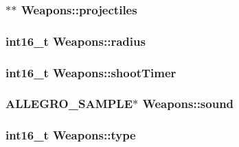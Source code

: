 \subsubsection[{projectiles}]{$\ast$$\ast$ Weapons\+::projectiles\hspace{0.3cm}{\ttfamily [protected]}}\label{class_weapons_a8495428b263ca37532201254df911dcc}
\hypertarget{class_weapons_a51aba0764e4873f32acc1f627328346f}{}
\subsubsection[{radius}]{\setlength{\rightskip}{0pt plus 5cm}int16\+\_\+t Weapons\+::radius\hspace{0.3cm}{\ttfamily [protected]}}\label{class_weapons_a51aba0764e4873f32acc1f627328346f}
\hypertarget{class_weapons_a9556c5663357877509683cd21da1fdf6}{}
\subsubsection[{shoot\+Timer}]{\setlength{\rightskip}{0pt plus 5cm}int16\+\_\+t Weapons\+::shoot\+Timer\hspace{0.3cm}{\ttfamily [protected]}}\label{class_weapons_a9556c5663357877509683cd21da1fdf6}
\hypertarget{class_weapons_a7287128c84711719a2d6afb85bf512e5}{}
\subsubsection[{sound}]{\setlength{\rightskip}{0pt plus 5cm}A\+L\+L\+E\+G\+R\+O\+\_\+\+S\+A\+M\+P\+L\+E$\ast$ Weapons\+::sound\hspace{0.3cm}{\ttfamily [protected]}}\label{class_weapons_a7287128c84711719a2d6afb85bf512e5}
\hypertarget{class_weapons_a42908d6d74c3c4d95805caec5db1577d}{}
\subsubsection[{type}]{\setlength{\rightskip}{0pt plus 5cm}int16\+\_\+t Weapons\+::type\hspace{0.3cm}{\ttfamily [protected]}}\label{class_weapons_a42908d6d74c3c4d95805caec5db1577d}
\hypertarget{class_weapons_af9bcea79386a27736973ae767ef8a408}{}
